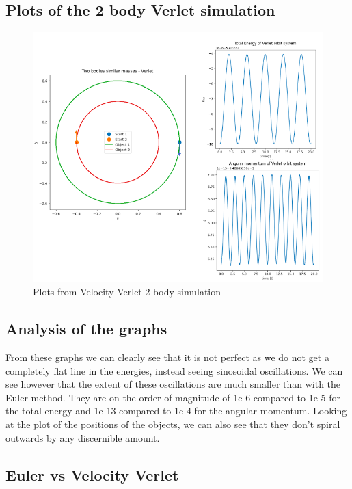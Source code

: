 \documentclass[11pt]{article}
\begin{document}
\subsection{Plots of the 2 body Verlet simulation}
\begin{figure}[!ht]
\centerline{\includegraphics[scale=0.45]{Pictures/Verlet_2bodies.png}}
\caption{Plots from Velocity Verlet 2 body simulation}
\label{2BodyGraph}
\end{figure}



\subsection{Analysis of the graphs}

From these graphs we can clearly see that it is not perfect as we do not get a completely flat line in the energies, instead seeing sinosoidal oscillations. We can see however that the extent of these oscillations are much smaller than with the Euler method. They are on the order of magnitude of 1e-6 compared to 1e-5 for the total energy and 1e-13 compared to 1e-4 for the angular momentum. Looking at the plot of the positions of the objects, we can also see that they don't spiral outwards by any discernible amount.

\subsection{Euler vs Velocity Verlet}
\end{document}
